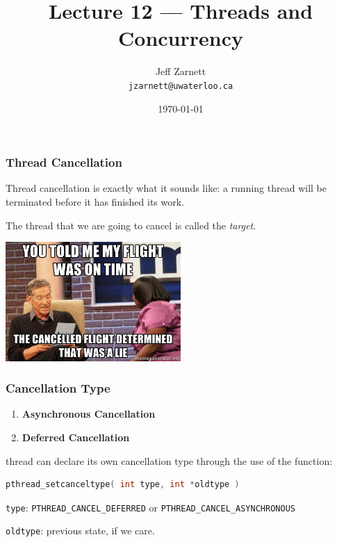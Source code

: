 

\title{Lecture 12 --- Threads and Concurrency }

\author{Jeff Zarnett \\ \small \texttt{jzarnett@uwaterloo.ca}}
\date{\today}




\begin{frame}
	\titlepage
\end{frame}


\begin{frame}
	\frametitle{Thread Cancellation}

	Thread cancellation is exactly what it sounds like: a running thread will be terminated before it has finished its work.

	The thread that we are going to cancel is called the \textit{target}.

	\begin{center}
		\includegraphics[width=0.5\textwidth]{images/canceled_flight.jpg}
	\end{center}

\end{frame}


\begin{frame}[fragile]
	\frametitle{Cancellation Type}

	\begin{enumerate}
		\item \textbf{Asynchronous Cancellation}
		\item \textbf{Deferred Cancellation}
	\end{enumerate}

	thread can declare its own cancellation type through the use of the function:
	\begin{lstlisting}[language=C]
pthread_setcanceltype( int type, int *oldtype )
\end{lstlisting}

	\texttt{type}: \texttt{PTHREAD\_CANCEL\_DEFERRED} or \texttt{PTHREAD\_CANCEL\_ASYNCHRONOUS}

	\texttt{oldtype}: previous state, if we care.

\end{frame}

